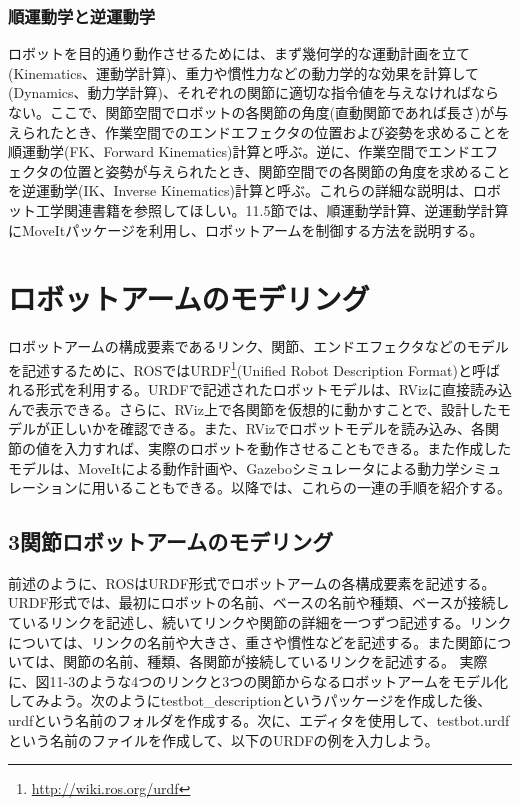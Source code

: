 \subsubsection{順運動学と逆運動学}

ロボットを目的通り動作させるためには、まず幾何学的な運動計画を立て(Kinematics、運動学計算)、重力や慣性力などの動力学的な効果を計算して(Dynamics、動力学計算)、それぞれの関節に適切な指令値を与えなければならない。ここで、関節空間でロボットの各関節の角度(直動関節であれば長さ)が与えられたとき、作業空間でのエンドエフェクタの位置および姿勢を求めることを順運動学(FK、Forward Kinematics)計算と呼ぶ。逆に、作業空間でエンドエフェクタの位置と姿勢が与えられたとき、関節空間での各関節の角度を求めることを逆運動学(IK、Inverse Kinematics)計算と呼ぶ。これらの詳細な説明は、ロボット工学関連書籍を参照してほしい。11.5節では、順運動学計算、逆運動学計算にMoveItパッケージを利用し、ロボットアームを制御する方法を説明する。

\section{ロボットアームのモデリング}

ロボットアームの構成要素であるリンク、関節、エンドエフェクタなどのモデルを記述するために、ROSではURDF\footnote{\url{http://wiki.ros.org/urdf}}(Unified Robot Description Format)と呼ばれる形式を利用する。URDFで記述されたロボットモデルは、RVizに直接読み込んで表示できる。さらに、RViz上で各関節を仮想的に動かすことで、設計したモデルが正しいかを確認できる。また、RVizでロボットモデルを読み込み、各関節の値を入力すれば、実際のロボットを動作させることもできる。また作成したモデルは、MoveItによる動作計画や、Gazeboシミュレータによる動力学シミュレーションに用いることもできる。以降では、これらの一連の手順を紹介する。

\subsection{3関節ロボットアームのモデリング}

前述のように、ROSはURDF形式でロボットアームの各構成要素を記述する。URDF形式では、最初にロボットの名前、ベースの名前や種類、ベースが接続しているリンクを記述し、続いてリンクや関節の詳細を一つずつ記述する。リンクについては、リンクの名前や大きさ、重さや慣性などを記述する。また関節については、関節の名前、種類、各関節が接続しているリンクを記述する。
実際に、図11-3のような4つのリンクと3つの関節からなるロボットアームをモデル化してみよう。次のようにtestbot\_descriptionというパッケージを作成した後、urdfという名前のフォルダを作成する。次に、エディタを使用して、testbot.urdfという名前のファイルを作成して、以下のURDFの例を入力しよう。


